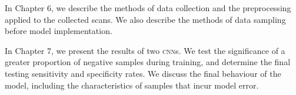 In Chapter 6, we describe the methods of data collection and the preprocessing applied to the collected scans. We also describe the methods of data sampling before model implementation.

In Chapter 7, we present the results of two \textsc{cnn}s. We test the significance of a greater proportion of negative samples during training, and determine the final testing sensitivity and specificity rates. We discuss the final behaviour of the model, including the characteristics of samples that incur model error.

%
%
%





%
%
